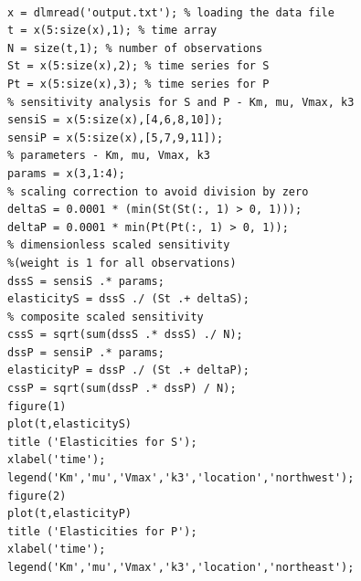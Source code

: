\begin{verbatim}

x = dlmread('output.txt'); % loading the data file
t = x(5:size(x),1); % time array
N = size(t,1); % number of observations
St = x(5:size(x),2); % time series for S
Pt = x(5:size(x),3); % time series for P
% sensitivity analysis for S and P - Km, mu, Vmax, k3 
sensiS = x(5:size(x),[4,6,8,10]); 
sensiP = x(5:size(x),[5,7,9,11]);
% parameters - Km, mu, Vmax, k3
params = x(3,1:4); 
% scaling correction to avoid division by zero
deltaS = 0.0001 * (min(St(St(:, 1) > 0, 1))); 
deltaP = 0.0001 * min(Pt(Pt(:, 1) > 0, 1));
% dimensionless scaled sensitivity 
%(weight is 1 for all observations)
dssS = sensiS .* params; 
elasticityS = dssS ./ (St .+ deltaS); 
% composite scaled sensitivity
cssS = sqrt(sum(dssS .* dssS) ./ N); 
dssP = sensiP .* params;
elasticityP = dssP ./ (St .+ deltaP); 
cssP = sqrt(sum(dssP .* dssP) / N); 
figure(1)
plot(t,elasticityS)
title ('Elasticities for S');
xlabel('time');
legend('Km','mu','Vmax','k3','location','northwest');
figure(2)
plot(t,elasticityP)
title ('Elasticities for P');
xlabel('time');
legend('Km','mu','Vmax','k3','location','northeast');

\end{verbatim}


